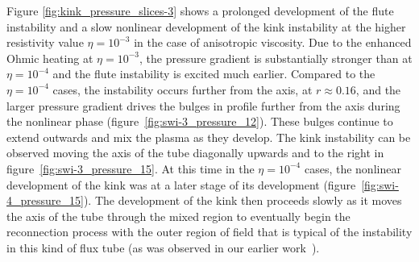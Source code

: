 \documentclass[fleqn,usenatbib]{mnras}
\newcommand{\rs}[2]{{#2}}
\begin{document}
\rs{Figures \ref{fig:kink_pressure_slices-3} show the}{Figure
  \ref{fig:kink_pressure_slices-3} shows a} prolonged 
development of the flute instability and \rs{the}{a} slow
nonlinear development of the kink \rs{}{instability at the higher
  resistivity value $\eta=10^{-3}$ in the case of anisotropic viscosity}. Due to the enhanced Ohmic heating 
\rs{when}{at} $\eta=10^{-3}$, the pressure gradient is substantially stronger
than \rs{when}{at} $\eta=10^{-4}$ and the flute instability is
excited much earlier. Compared to the $\eta=10^{-4}$ cases, the
instability occurs further from the axis, at $r\approx0.16$, and the
larger pressure gradient drives the bulges \rs{}{in profile} further
from the axis \rs{in}{during} the nonlinear phase
(figure~\ref{fig:swi-3_pressure_12}). These bulges continue to extend
outwards and mix the plasma as they develop. The kink instability can
be observed moving the axis of the tube diagonally upwards and to the
right in figure~\ref{fig:swi-3_pressure_15}. At this time in the
$\eta=10^{-4}$ cases, the nonlinear development of the kink was
\rs{further along}{at a later stage of its development} (figure~\ref{fig:swi-4_pressure_15}). The development of
the kink then proceeds slowly as it moves the axis of the tube through
the mixed region to eventually begin the reconnection process with the
outer region of field that is typical of the instability in this kind
of flux tube (as was observed in
\rs{chapter}{our earlier work}~\citep{quinnEffectAnisotropicViscosity2020}). 
\end{document}
